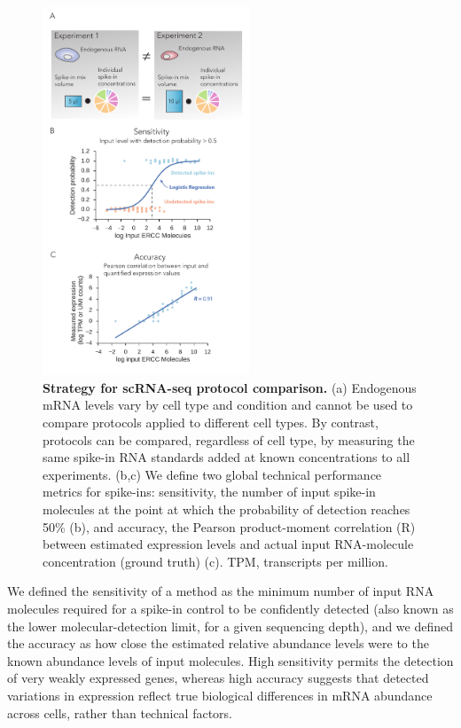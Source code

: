\begin{figure}
    \centering
    \includegraphics[width=0.55\textwidth]{"Figure 1"}
    \caption[Strategy for scRNA-seq protocol comparison]{
    \textbf{Strategy for scRNA-seq protocol comparison.} (a) Endogenous mRNA levels vary by cell type and condition and cannot be used to compare protocols applied to different cell types. By contrast, protocols can be compared, regardless of cell type, by measuring the same spike-in RNA standards added at known concentrations to all experiments. (b,c) We define two global technical performance metrics for spike-ins: sensitivity, the number of input spike-in molecules at the point at which the probability of detection reaches 50\% (b), and accuracy, the Pearson product-moment correlation (R) between estimated expression levels and actual input RNA-molecule concentration (ground truth) (c). TPM, transcripts per million.}
    \label{fig:strategy}
\end{figure}

We defined the sensitivity of a method as the minimum number of input RNA molecules required for a spike-in control to be confidently detected (also known as the lower molecular-detection limit, for a given sequencing depth), and we defined the accuracy as how close the estimated relative abundance levels were to the known abundance levels of input molecules. High sensitivity permits the detection of very weakly expressed genes, whereas high accuracy suggests that detected variations in expression reflect true biological differences in mRNA abundance across cells, rather than technical factors.

